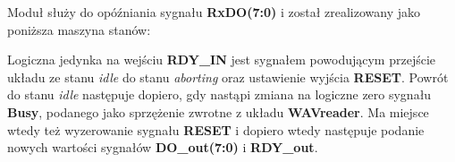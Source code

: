 \documentclass{article}
\begin{document}
\begin{figure}[H]
    \centering
\end{figure}



Moduł służy do opóźniania sygnału \textbf{RxDO(7:0)} i został zrealizowany jako poniższa maszyna stanów:

\begin{figure}[H]
    \centering
\end{figure}

Logiczna jedynka na wejściu \textbf{RDY\_IN} jest sygnałem powodującym przejście układu ze stanu \textit{idle} do stanu \textit{aborting} oraz ustawienie wyjścia \textbf{RESET}.
Powrót do stanu \textit{idle} następuje dopiero, gdy nastąpi zmiana na logiczne zero sygnału \textbf{Busy}, podanego jako sprzężenie zwrotne z układu \textbf{WAVreader}. Ma miejsce wtedy też wyzerowanie sygnału \textbf{RESET} i dopiero wtedy następuje podanie nowych wartości sygnałów \textbf{DO\_out(7:0)} i \textbf{RDY\_out}.
\end{document}
